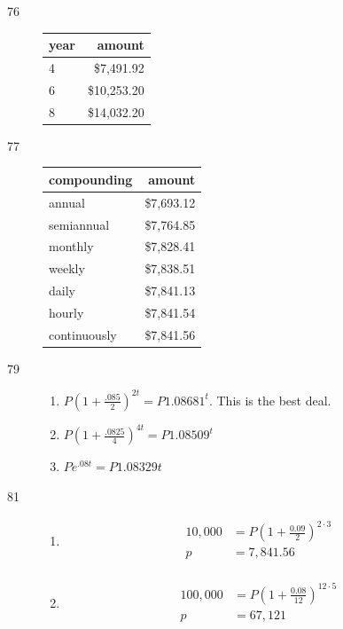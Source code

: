 \documentclass{exam}
\begin{document}
\begin{description}
      \item[76]
        \begin{tabular}[H]{lr}
          \toprule
          year & amount \\
          \midrule
          4    & \$7,491.92 \\
          6    & \$10,253.20 \\
          8    & \$14,032.20 \\
          \bottomrule
        \end{tabular}

      \item[77]
        \begin{tabular}[H]{lr}
          \toprule
          compounding  & amount \\
          \midrule
          annual       & \$7,693.12 \\
          semiannual   & \$7,764.85 \\
          monthly      & \$7,828.41 \\
          weekly       & \$7,838.51 \\
          daily        & \$7,841.13 \\
          hourly       & \$7,841.54 \\
          continuously & \$7,841.56 \\
          \bottomrule
        \end{tabular}

      \item[79]
        \begin{enumerate}[i]
          \item $P \left( 1 + \frac{.085}{2} \right)^{2t} = P 1.08681^t$.  This is the best deal.
          \item $P \left( 1 + \frac{.0825}{4} \right)^{4t} = P 1.08509^t$
          \item $P e^{.08t} = P 1.08329 t$
        \end{enumerate}

      \item[81]
        \begin{enumerate}[a]
          \item 
            \begin{align*}
              10,000 &= P  \left( 1 + \frac{0.09}{2} \right)^{2 \cdot 3} \\
              p &= 7,841.56 \\
            \end{align*}

          \item 
            \begin{align*}
              100,000 &= P  \left( 1 + \frac{0.08}{12} \right)^{12 \cdot 5} \\
              p &= 67,121 \\
            \end{align*}
        \end{enumerate}


\end{description}
\end{document}
